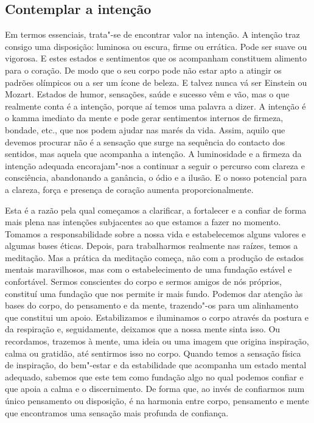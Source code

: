 \subsection{Contemplar a intenção}

Em termos essenciais, trata"-se de encontrar valor na intenção. A intenção traz
consigo uma disposição: luminosa ou escura, firme ou errática. Pode ser suave ou
vigorosa. E estes estados e sentimentos que os acompanham constituem alimento
para o coração. De modo que o seu corpo pode não estar apto a atingir os padrões
olímpicos ou a ser um ícone de beleza. E talvez nunca vá ser Einstein ou Mozart.
Estados de humor, sensações, saúde e sucesso vêm e vão, mas o que realmente
conta é a intenção, porque aí temos uma palavra a dizer. A intenção é o kamma
imediato da mente e pode gerar sentimentos internos de firmeza, bondade, etc.,
que nos podem ajudar nas marés da vida. Assim, aquilo que devemos procurar não é
a sensação que surge na sequência do contacto dos sentidos, mas aquela que
acompanha a intenção. A luminosidade e a firmeza da intenção adequada
encorajam"-nos a continuar a seguir o percurso com clareza e consciência,
abandonando a ganância, o ódio e a ilusão. E o nosso potencial para a clareza,
força e presença de coração aumenta proporcionalmente.

Esta é a razão pela qual começamos a clarificar, a fortalecer e a confiar de
forma mais plena nas intenções subjacentes ao que estamos a fazer no momento.
Tomamos a responsabilidade sobre a nossa vida e estabelecemos alguns valores e
algumas bases éticas. Depois, para trabalharmos realmente nas raízes, temos a
meditação. Mas a prática da meditação começa, não com a produção de estados
mentais maravilhosos, mas com o estabelecimento de uma fundação estável e
confortável. Sermos conscientes do corpo e sermos amigos de nós próprios,
constituí uma fundação que nos permite ir mais fundo. Podemos dar atenção às
bases do corpo, do pensamento e da mente, trazendo"-os para um alinhamento que
constitui um apoio. Estabilizamos e iluminamos o corpo através da postura e da
respiração e, seguidamente, deixamos que a nossa mente sinta isso. Ou
recordamos, trazemos à mente, uma ideia ou uma imagem que origina inspiração,
calma ou gratidão, até sentirmos isso no corpo. Quando temos a sensação física
de inspiração, do bem"-estar e da estabilidade que acompanha um estado mental
adequado, sabemos que este tem como fundação algo no qual podemos confiar e que
apoia a calma e o discernimento. De forma que, ao invés de confiarmos num único
pensamento ou disposição, é na harmonia entre corpo, pensamento e mente que
encontramos uma sensação mais profunda de confiança.

